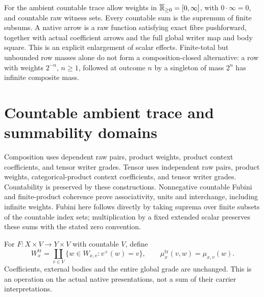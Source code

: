 \documentclass[11pt]{article}
\begin{document}
For the ambient countable trace allow weights in $\overline{\mathbb R}_{\geq0}=[0,\infty]$, with $0\cdot\infty=0$, and countable raw witness sets. Every countable sum is the supremum of finite subsums. A native arrow is a raw function satisfying exact fibre pushforward, together with actual coefficient arrows and the full global writer map and body square. This is an explicit enlargement of scalar effects. Finite-total but unbounded row masses alone do not form a composition-closed alternative: a row with weights $2^{-n}$, $n\geq1$, followed at outcome $n$ by a singleton of mass $2^n$ has infinite composite mass.

\section{Countable ambient trace and summability domains}
Composition uses dependent raw pairs, product weights, product context coefficients, and tensor writer grades. Tensor uses independent raw pairs, product weights, categorical-product context coefficients, and tensor writer grades. Countability is preserved by these constructions. Nonnegative countable Fubini and finite-product coherence prove associativity, units and interchange, including infinite weights. Fubini here follows directly by taking suprema over finite subsets of the countable index sets; multiplication by a fixed extended scalar preserves these sums with the stated zero convention.

For $F:X\times V\to Y\times V$ with countable $V$, define
\[
 W^{\operatorname{tr}}_x=\coprod_{v\in V}\{w\in W_{x,v}:v^+(w)=v\},\qquad
 \mu^{\operatorname{tr}}_x(v,w)=\mu_{x,v}(w).                 \tag{1}
\]
Coefficients, external bodies and the entire global grade are unchanged. This is an operation on the actual native presentations, not a sum of their carrier interpretations.
\end{document}
